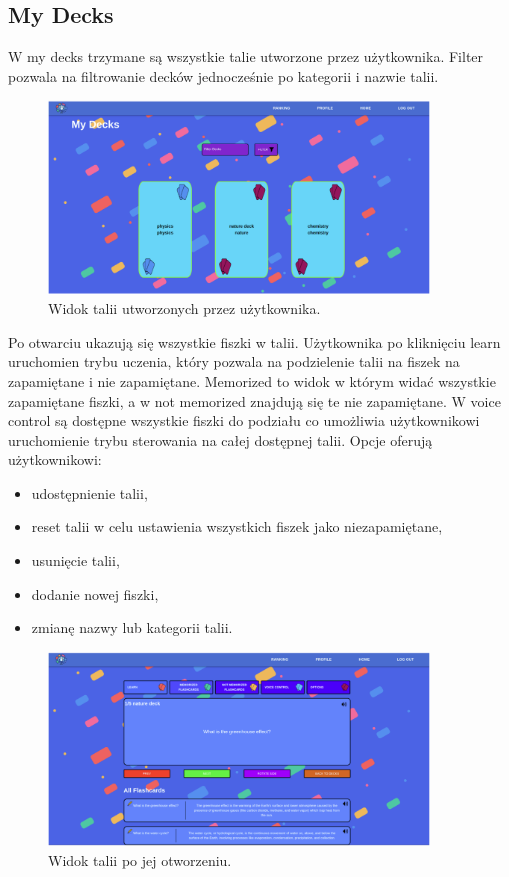 \subsection{My Decks}
W my decks trzymane są wszystkie talie utworzone przez użytkownika. Filter pozwala na filtrowanie decków jednocześnie po kategorii i nazwie talii.


\begin{figure}[H]
    \centering
    \includegraphics[width=0.9\textwidth]{chapters/chapter_10/images_web/web_my_decks}
    \caption{Widok talii utworzonych przez użytkownika.}
    \label{img:web_my_decks}
\end{figure}


Po otwarciu ukazują się wszystkie fiszki w talii. Użytkownika po kliknięciu learn uruchomien trybu uczenia, który pozwala na podzielenie talii na fiszek na zapamiętane i nie zapamiętane. Memorized to widok w którym widać wszystkie zapamiętane fiszki, a w not memorized znajdują się te nie zapamiętane. W voice control są dostępne wszystkie fiszki do podziału co umożliwia użytkownikowi uruchomienie trybu sterowania na całej dostępnej talii. Opcje oferują użytkownikowi:


\begin{itemize}
    \item udostępnienie talii,
    \item reset talii w celu ustawienia wszystkich fiszek jako niezapamiętane,
    \item usunięcie talii,
    \item dodanie nowej fiszki,
    \item zmianę nazwy lub kategorii talii.
\end{itemize}


\begin{figure}[H]
    \centering
    \includegraphics[width=0.9\textwidth]{chapters/chapter_10/images_web/web_deck}
    \caption{Widok talii po jej otworzeniu.}
    \label{img:web_deck}
\end{figure}


